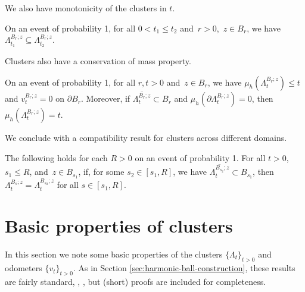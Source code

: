 \documentclass[12pt]{amsart}
\numberwithin{equation}{section}
\newcommand{\cluster}[2]{\hyperref[eq:non-co-set]{\mathit{\Lambda}^{#1}_{#2}}}
\newcommand{\odometer}[2]{\hyperref[eq:limit-odometer]{v^{#1}_{#2}}}
\begin{document}
	
	
	
	We also have monotonicity of the clusters in $t$. 
	\begin{lemma} \label{lemma:monotonicity}
		On an event of probability 1, for all $0 < t_1 \leq t_2$ and~$r > 0$,~$z \in B_r$, we have $\cluster{B_r;z}{t_1} \subseteq \cluster{B_r;z}{t_2}$.
	\end{lemma}
	
	Clusters also have a conservation of mass property. 
	\begin{lemma} \label{lemma:conservation-of-mass}
		On an event of probability 1, for all $r,t > 0$ and~$z \in B_r$, we have $\mu_h({\cluster{B_r;z}{t}}) \leq t$ and $\odometer{B_r;z}{t} = 0$ on $\partial B_r$.  Moreover, if $\overline{{{\cluster{B_r;z}{t}}}} \subset B_r$ and $\mu_h(\partial {\cluster{B_r;z}{t}}) = 0$, then $\mu_h({\cluster{B_r;z}{t}}) = t$. 
	\end{lemma}
	
	
	
	
	We conclude with a compatibility result for clusters across different domains. 
	\begin{lemma} \label{lemma:cluster-compatibility}
		The following holds for each $R > 0$ on an event of probability 1. 
		For all $t > 0$, $s_1 \leq R$, and~$z \in B_{s_1}$, if, for some $s_2 \in [s_1, R]$, we have $\overline{\cluster{B_{s_2};z}{t}} \subset B_{s_1}$, 
		then  $\cluster{B_{s};z}{t} = \cluster{B_{s_2};z}{t}$ for all $s \in [s_1, R]$.
	\end{lemma}
	
	
	\section{Basic properties of clusters} \label{sec:basic-properties-cluster}
	
	In this section we note some basic properties of the clusters $\{{\cluster{}{t}}\}_{t > 0}$  and 
	odometers $\{\odometer{}{t}\}_{t > 0}$. As in Section \ref{sec:harmonic-ball-construction}, these results are fairly standard, \eg, \cite{sakai1984solutions, gustafsson1990onquadraturedomains, hedenmalm2002hele,shahgholian2013harmonic}, but (short) proofs are included for completeness. 
	
\end{document}
